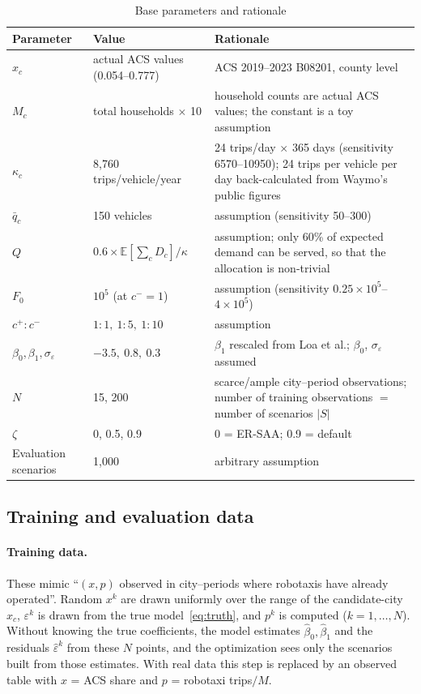 \documentclass[10pt,a4paper]{article}
\begin{document}
\begin{table}[H]\centering\small
\caption{Base parameters and rationale}\label{tab:param}
\begin{tabular}{@{}llp{}@{}}
\toprule
Parameter & Value & Rationale \\ \midrule
$x_c$ & actual ACS values (0.054--0.777) & ACS 2019--2023 B08201, county level \\
$M_c$ & total households $\times$ 10 & household counts are actual ACS values; the constant is a toy assumption \\
$\kappa_c$ & 8{,}760 trips/vehicle/year & 24 trips/day $\times$ 365 days (sensitivity 6570--10950); 24 trips per vehicle per day back-calculated from Waymo's public figures \\
$\bar q_c$ & 150 vehicles & assumption (sensitivity 50--300) \\
$Q$ & $0.6\times\mathbb E[\sum_c D_c]/\kappa$ & assumption; only 60\% of expected demand can be served, so that the allocation is non-trivial \\
$F_0$ & $10^5$ (at $c^-=1$) & assumption (sensitivity $0.25\times10^5$--$4\times10^5$) \\
$c^+:c^-$ & $1:1,\ 1:5,\ 1:10$ & assumption \\
$\beta_0,\beta_1,\sigma_\varepsilon$ & $-3.5,\ 0.8,\ 0.3$ & $\beta_1$ rescaled from Loa et al.; $\beta_0$, $\sigma_\varepsilon$ assumed \\
$N$ & 15, 200 & scarce/ample city--period observations; number of training observations $=$ number of scenarios $|S|$ \\
$\zeta$ & 0, 0.5, 0.9 & 0 = ER-SAA; 0.9 = default \\
Evaluation scenarios & 1{,}000 & arbitrary assumption \\
\bottomrule
\end{tabular}
\end{table}

\subsection{Training and evaluation data}

\paragraph{Training data.}
These mimic ``$(x,p)$ observed in city--periods where robotaxis have already operated''. Random $x^k$ are drawn uniformly over the range of the candidate-city $x_c$, $\varepsilon^k$ is drawn from the true model~\eqref{eq:truth}, and $p^k$ is computed ($k=1,\dots,N$). Without knowing the true coefficients, the model estimates $\hat\beta_0,\hat\beta_1$ and the residuals $\hat\varepsilon^k$ from these $N$ points, and the optimization sees only the scenarios built from those estimates. With real data this step is replaced by an observed table with $x$ = ACS share and $p$ = robotaxi trips$/M$.
\end{document}
